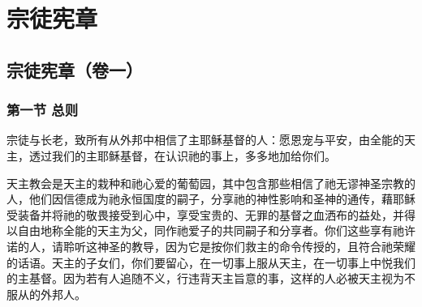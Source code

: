 
\chapter{宗徒宪章}


\newline{}\newline{}\newline{}\newline{}\newline{}\newline{}\newline{}\par



\section{宗徒宪章（卷一）}

\par


\subsection{第一节 总则}

宗徒与长老，致所有从外邦中相信了主耶稣基督的人：愿恩宠与平安，由全能的天主，透过我们的主耶稣基督，在认识祂的事上，多多地加给你们。\par

天主教会是天主的栽种和祂心爱的葡萄园，其中包含那些相信了祂无谬神圣宗教的人，他们因信德成为祂永恒国度的嗣子，分享祂的神性影响和圣神的通传，藉耶稣受装备并将祂的敬畏接受到心中，享受宝贵的、无罪的基督之血洒布的益处，并得以自由地称全能的天主为父，同作祂爱子的共同嗣子和分享者。你们这些享有祂许诺的人，请聆听这神圣的教导，因为它是按你们救主的命令传授的，且符合祂荣耀的话语。天主的子女们，你们要留心，在一切事上服从天主，在一切事上中悦我们的主基督。因为若有人追随不义，行违背天主旨意的事，这样的人必被天主视为不服从的外邦人。\par

